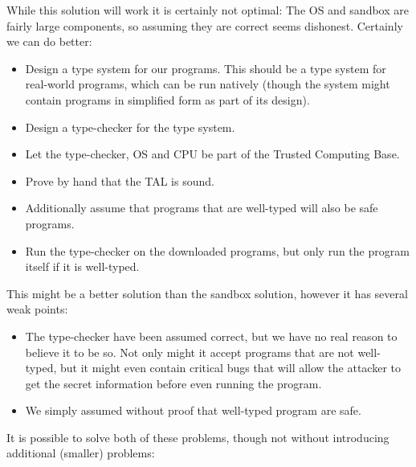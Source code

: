 While this solution will work it is certainly not optimal: The OS and sandbox
are fairly large components, so assuming they are correct seems dishonest. Certainly
we can do better:

\begin{itemize}
\item Design a type system for our programs. This should be a type system for
  real-world programs, which can be run natively (though the system might
  contain programs in simplified form as part of its design).
\item Design a type-checker for the type system.
\item Let the type-checker, OS and CPU be part of the Trusted Computing Base.
\item Prove by hand that the TAL is sound.
\item Additionally assume that programs that are well-typed will also be safe
  programs.
\item Run the type-checker on the downloaded programs, but only run the program
  itself if it is well-typed.
\end{itemize}

This might be a better solution than the sandbox solution, however it has
several weak points:

\begin{itemize}
\item The type-checker have been assumed correct, but we have no real reason to
  believe it to be so. Not only might it accept programs that are not
  well-typed, but it might even contain critical bugs that will allow the
  attacker to get the secret information before even running the program.
\item We simply assumed without proof that well-typed program are safe.
\end{itemize}

It is possible to solve both of these problems, though not without introducing
additional (smaller) problems:

